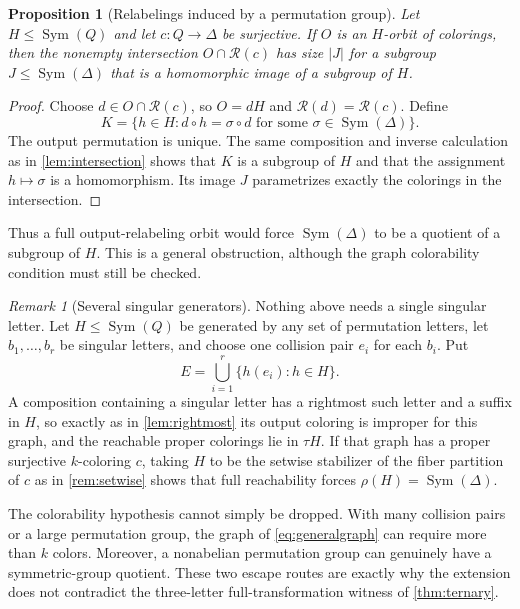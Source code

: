 \documentclass[11pt,a4paper]{article}
\numberwithin{equation}{section}
\newtheorem{proposition}[theorem]{Proposition}
\theoremstyle{definition}
\theoremstyle{remark}
\newtheorem{remark}[theorem]{Remark}
\newcommand{\D}{\Delta}
\newcommand{\Sym}{\operatorname{Sym}}
\begin{document}
\begin{proposition}[Relabelings induced by a permutation group]\label{prop:section}
Let $H\le\Sym(Q)$ and let $c:Q\to\D$ be surjective. If $O$ is an $H$-orbit
of colorings, then the nonempty intersection $O\cap\mathcal R(c)$ has size
$|J|$ for a subgroup $J\le\Sym(\D)$ that is a homomorphic image of a subgroup
of $H$.
\end{proposition}
\begin{proof}
Choose $d\in O\cap\mathcal R(c)$, so $O=dH$ and
$\mathcal R(d)=\mathcal R(c)$. Define
\[
 K=\{h\in H:d\circ h=\sigma\circ d
                \text{ for some }\sigma\in\Sym(\D)\}.
\]
The output permutation is unique. The same composition and inverse
calculation as in \cref{lem:intersection} shows that $K$ is a subgroup of
$H$ and that the assignment $h\mapsto\sigma$ is a homomorphism. Its image
$J$ parametrizes exactly the colorings in the intersection.
\end{proof}

Thus a full output-relabeling orbit would force $\Sym(\D)$ to be a quotient
of a subgroup of $H$. This is a general obstruction, although the graph
colorability condition must still be checked.

\begin{remark}[Several singular generators]\label{rem:severalsingular}
Nothing above needs a single singular letter. Let $H\le\Sym(Q)$ be generated
by any set of permutation letters, let $b_1,\ldots,b_r$ be singular
letters, and choose one collision pair $e_i$ for each $b_i$. Put
\begin{equation}\label{eq:generalgraph}
 E=\bigcup_{i=1}^{r}\{h(e_i):h\in H\}.
\end{equation}
A composition containing a singular letter has a rightmost such letter and a
suffix in $H$, so exactly as in \cref{lem:rightmost} its output coloring is
improper for this graph, and the reachable proper colorings lie in $\tau H$.
If that graph has a proper surjective $k$-coloring $c$, taking $H$ to be the
setwise stabilizer of the fiber partition of $c$ as in \cref{rem:setwise}
shows that full reachability forces $\rho(H)=\Sym(\D)$.

The colorability hypothesis cannot simply be dropped. With many collision
pairs or a large permutation group, the graph of \eqref{eq:generalgraph} can
require more than $k$ colors. Moreover, a nonabelian permutation group can
genuinely have a symmetric-group quotient. These two escape routes are
exactly why the extension does not contradict the three-letter
full-transformation witness of \cref{thm:ternary}.
\end{remark}
\end{document}
